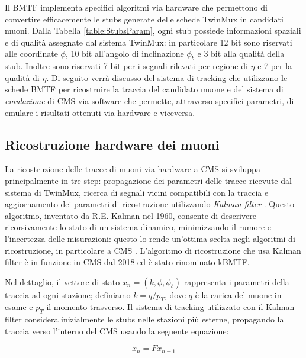 Il BMTF implementa specifici algoritmi via hardware che permettono di convertire efficacemente le stubs generate delle schede TwinMux in candidati muoni. Dalla Tabella \ref{table:StubsParam}, ogni stub possiede informazioni spaziali e di qualità assegnate dal sistema TwinMux: in particolare 12 bit sono riservati alle coordinate $\phi$, 10 bit all'angolo di inclinazione $\phi_b$ e 3 bit alla qualità della stub. Inoltre sono riservati 7 bit per i segnali rilevati per regione di $\eta$ e 7 per la qualità di $\eta$. Di seguito verrà discusso del sistema di tracking che utilizzano le schede BMTF per ricostruire la traccia del candidato muone e del sistema di \textit{emulazione} di CMS via software che permette, attraverso specifici parametri, di emulare i risultati ottenuti via hardware e viceversa.


\subsection{Ricostruzione hardware dei muoni}
\label{sec:KalmannFilter}

La ricostruzione delle tracce di muoni via hardware a CMS si sviluppa principalmente in tre step: propagazione dei parametri delle tracce ricevute dal sistema di TwinMux, ricerca di segnali vicini compatibili con la traccia e aggiornamento dei parametri di ricostruzione utilizzando \textit{Kalman filter} \cite{Summers:2728522}. \newline
Questo algoritmo, inventato da R.E. Kalman nel 1960, consente di descrivere ricorsivamente lo stato di un sistema dinamico, minimizzando il rumore e l'incertezza delle misurazioni: questo lo rende un'ottima scelta negli algoritmi di ricostruzione, in particolare a CMS \cite{welch1995introduction}. L'algoritmo di ricostruzione che usa Kalman filter è in funzione in CMS dal 2018 ed è stato rinominato kBMTF. 

Nel dettaglio, il vettore di stato $x_n = (k, \phi, \phi_b)$ rappresenta i parametri della traccia ad ogni stazione; definiamo $k = q/p_T$, dove $q$ è la carica del muone in esame e $p_T$ il momento trasverso. Il sistema di tracking utilizzato con il Kalman filter considera inizialmente le stubs nelle stazioni più esterne, propagando la traccia verso l'interno del CMS usando la seguente equazione:

\begin{equation}
  \label{eq:KalmanFilterEq}
    x_n = F x_{n-1}
\end{equation}

